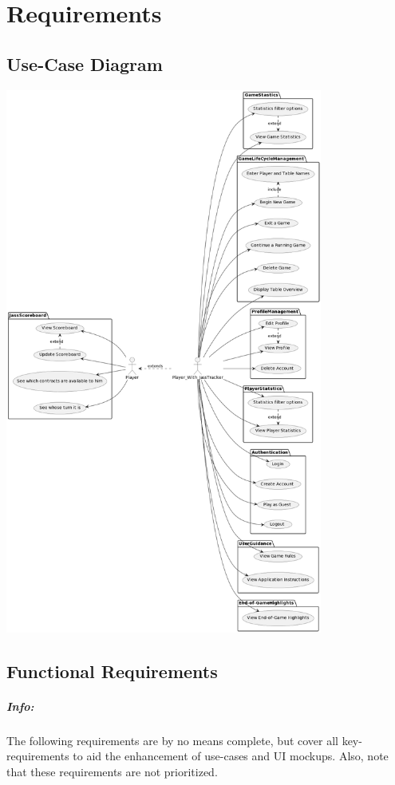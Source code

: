 \chapter{Requirements}

\section{Use-Case Diagram}
\includegraphics[height=18cm]{resources/diagrams/use-case}


\section {Functional Requirements}

\paragraph{Info:}
The following requirements are by no means complete, but cover all key-requirements to aid the enhancement of use-cases and UI mockups. 
Also, note that these requirements are not prioritized.

